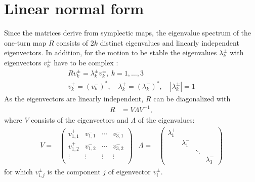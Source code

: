 \section{Linear normal form}
\label{opt:sec:1}
Since the matrices derive from symplectic maps, the eigenvalue spectrum of the one-turn map $R$ consists of 2$k$ distinct eigenvalues and linearly independent eigenvectors. In addition, for the motion to be stable the eigenvalues $\lambda_k^{\pm}$ with eigenvectors $v_k^{\pm}$ have to be complex \cite{willeke88}:
\begin{align}
R v_k^\pm  =  \lambda_k^\pm v_k^\pm, \ k=1,\ldots, 3 \\
v_k^+=(v_k^-)^*, \quad \lambda_k^+=(\lambda_k^-)^*, \quad |\lambda_k^{\pm}|=1
\end{align}
As the eigenvectors are linearly independent, $R$ can be diagonalized with
\begin{align}
R &= V \Lambda V^{-1},
\end{align}
where $V$ consists of the eigenvectors and $\Lambda$ of the eigenvalues:
\begin{align}
V=&\left(
\begin{array}{cccc}
v^+_{1,1} & v^-_{1,1} & \cdots & v^-_{3,1}\\
v^+_{1,2} & v^-_{1,2} & \cdots & v^-_{3,2}\\
\vdots    & \vdots    & \vdots & \vdots \\
\end{array}
\right)  &
\Lambda=&\left(
\begin{array}{cccc}
\lambda^+_1 &    & &\\
& \lambda^-_1 & &\\
& & \ddots & \\
& & & \lambda^-_3
\end{array}
\right)
\end{align}
for which $v^{\pm}_{i,j}$ is the component $j$ of eigenvector $v_i^{\pm}$.

